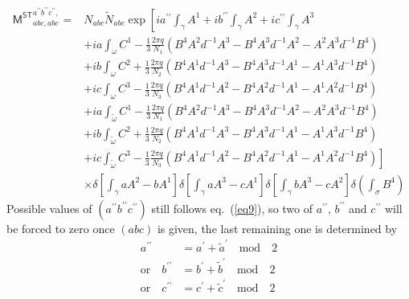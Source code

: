 \documentclass[11pt,nofootinbib,preprint]{revtex4-1}
\begin{document}
\begin{align}
	\mathsf{M^{ST}}_{abc,abc}^{a^{\prime\prime}b^{\prime\prime}c^{\prime\prime},}=&N_{abc}\tilde{N}_{abc}\exp \left[ ia^{\prime\prime}\int_{\gamma}{A^1}+ib^{\prime\prime}\int_{\gamma}{A^2}+ic^{\prime\prime}\int_{\gamma}{A^3} \right. \nonumber 
	\\
	&+ia\int_{\omega}{C^1-\frac{1}{3}\frac{2\pi q}{N_1}\left( B^4A^2d^{-1}A^3-B^4A^3d^{-1}A^2-A^2A^3d^{-1}B^4 \right)} \nonumber
	\\
	&+ib\int_{\omega}{C^2+\frac{1}{3}\frac{2\pi q}{N_2}\left( B^4A^1d^{-1}A^3-B^4A^3d^{-1}A^1-A^1A^3d^{-1}B^4 \right)} \nonumber
	\\
	&+ic\int_{\omega}{C^3-\frac{1}{3}\frac{2\pi q}{N_3}\left( B^4A^1d^{-1}A^2-B^4A^2d^{-1}A^1-A^1A^2d^{-1}B^4 \right)} \nonumber
	\\
	&+ia\int_{\tilde{\omega}}{C^1-\frac{1}{3}\frac{2\pi q}{N_1}\left( B^4A^2d^{-1}A^3-B^4A^3d^{-1}A^2-A^2A^3d^{-1}B^4 \right)} \nonumber
	\\
	&+ib\int_{\tilde{\omega}}{C^2+\frac{1}{3}\frac{2\pi q}{N_2}\left( B^4A^1d^{-1}A^3-B^4A^3d^{-1}A^1-A^1A^3d^{-1}B^4 \right)} \nonumber
	\\
	&+\left. ic\int_{\tilde{\omega}}{C^3-\frac{1}{3}\frac{2\pi q}{N_3}\left( B^4A^1d^{-1}A^2-B^4A^2d^{-1}A^1-A^1A^2d^{-1}B^4 \right)} \right] \nonumber
	\\
	&\times \delta \left[ \int_{\gamma}{aA^2-bA^1} \right] \delta \left[ \int_{\gamma}{aA^3-cA^1} \right] \delta \left[ \int_{\gamma}{bA^3-cA^2} \right] \delta \left( \int_{\sigma}{B^4} \right) 
\end{align}
Possible values of $\left( a^{\prime\prime}b^{\prime\prime}c^{\prime\prime} \right)$ still follows eq.~(\ref{eq9}), so two of $a^{\prime\prime}$, $b^{\prime\prime}$ and $c^{\prime\prime}$ will be forced to zero once $\left( abc \right)$ is given, the last remaining one is determined by 
\begin{align}
	a^{\prime\prime}&=a^{\prime}+\tilde{a}^{\prime} \quad \text{mod} \quad 2  \nonumber 
	\\
	\text{or}\quad b^{\prime\prime}&=b^{\prime}+\tilde{b}^{\prime} \quad \text{mod} \quad 2  \nonumber 
	\\
	\text{or}\quad c^{\prime\prime}&=c^{\prime}+\tilde{c}^{\prime} \quad \text{mod} \quad 2 
\end{align}
\end{document}
